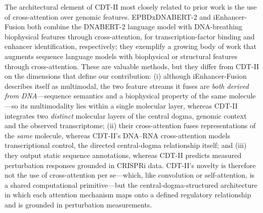 \documentclass[12pt,a4paper]{article}
\begin{document}
The architectural element of CDT-II most closely related to prior work is the use of cross-attention over genomic features. EPBDxDNABERT-2 \citep{kabir2024epbd} and iEnhancer-Fusion \citep{luo2025ienhancer} both combine the DNABERT-2 language model with DNA-breathing biophysical features through cross-attention, for transcription-factor binding and enhancer identification, respectively; they exemplify a growing body of work that augments sequence language models with biophysical or structural features through cross-attention. These are valuable methods, but they differ from CDT-II on the dimensions that define our contribution: (i) although iEnhancer-Fusion describes itself as multimodal, the two feature streams it fuses are \textit{both derived from DNA}---sequence semantics and a biophysical property of the same molecule---so its multimodality lies within a single molecular layer, whereas CDT-II integrates two \textit{distinct} molecular layers of the central dogma, genomic context and the observed transcriptome; (ii) their cross-attention fuses representations of the \textit{same} molecule, whereas CDT-II's DNA--RNA cross-attention models transcriptional control, the directed central-dogma relationship itself; and (iii) they output static sequence annotations, whereas CDT-II predicts measured perturbation responses grounded in CRISPRi data. CDT-II's novelty is therefore not the use of cross-attention per se---which, like convolution or self-attention, is a shared computational primitive---but the central-dogma-structured architecture in which each attention mechanism maps onto a defined regulatory relationship and is grounded in perturbation measurements.
\end{document}
